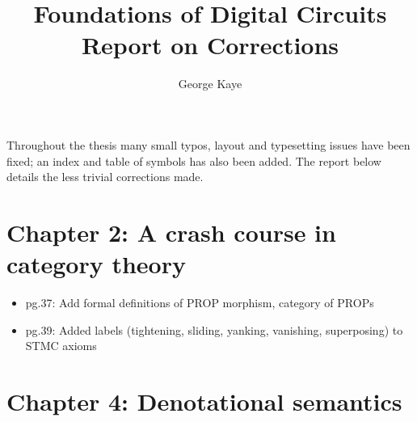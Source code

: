 \documentclass{article}
\title{Foundations of Digital Circuits\\Report on Corrections}
\author{George Kaye}
\date{}
\begin{document}
\maketitle

Throughout the thesis many small typos, layout and typesetting issues have been
fixed; an index and table of symbols has also been added.
The report below details the less trivial corrections made.

\section*{Chapter 2: A crash course in category theory}

\begin{itemize}
    \item pg.37: Add formal definitions of PROP morphism, category of PROPs
    \item pg.39: Added labels (tightening, sliding, yanking, vanishing,
          superposing) to STMC axioms
\end{itemize}

\section*{Chapter 4: Denotational semantics}
\end{document}
